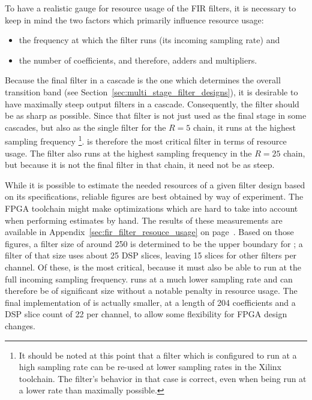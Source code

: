 To  have a  realistic gauge  for  resource usage  of  the FIR  filters, it  is
necessary to keep  in mind the two factors which  primarily influence resource
usage:
\begin{itemize}\tightlist
    \item
        the frequency  at which the  filter runs (its incoming  sampling rate)
        and
    \item
         the number of coefficients, and therefore, adders and multipliers.
\end{itemize}
Because the final filter in a cascade  is the one which determines the overall
transition  band  (see  Section~\ref{sec:multi_stage_filter_designs}),  it  is
desirable to have  maximally steep output filters  in a cascade. Consequently,
the filter  should be as  sharp as possible. Since that filter is
not just  used as the  final stage  in some cascades,  but also as  the single
filter for the $R=5$ chain, it runs at the highest sampling frequency%
\footnote{%
    It should be noted at this point  that a filter which is configured to run
    at a  high sampling  rate can be  re-used at lower  sampling rates  in the
    Xilinx toolchain. The filter's behavior in that case is correct, even when
    being run at a lower rate than maximally possible.%
}.
  is therefore  the most  critical  filter in  terms of  resource
usage. The filter  also runs  at the highest sampling frequency in
the $R=25$  chain, but because it  is not the  final filter in that  chain, it
need not be as steep.

While it is possible to estimate the needed resources of a given filter design
based on  its specifications,  reliable figures  are best  obtained by  way of
experiment. The FPGA toolchain might make optimizations which are hard to take
into  account  when  performing  estimates  by hand.   The  results  of  these
measurements are  available in  Appendix~\ref{sec:fir_filter_resouce_usage} on
page~\pageref{sec:fir_filter_resouce_usage}. Based on those  figures, a filter
size  of  around  \num{250}  is  determined  to  be  the  upper  boundary  for
; a filter  of that size uses about \num{25}  DSP slices, leaving
\num{15} slices for other filters per  channel.  Of these,  is the
most  critical, because  it must  also be  able to  run at  the full  incoming
sampling frequency.   runs at a much lower sampling  rate and can
therefore be of significant size without  a notable penalty in resource usage.
The final implementation of  is  actually smaller, at a length of
\num{204} coefficients and a DSP slice count of \num{22} per channel, to allow
some flexibility for FPGA design changes.

